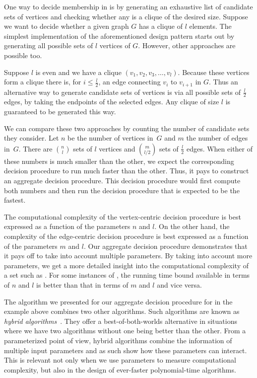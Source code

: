 \begin{example}
  One way to decide membership in  is by generating an exhaustive list of candidate sets of vertices and checking whether any is a clique of the desired size.
  Suppose we want to decide whether a given graph $G$ has a clique of $l$ elements.
  The simplest implementation of the aforementioned design pattern starts out by generating all possible sets of $l$ vertices of $G$.
  However, other approaches are possible too.

  Suppose $l$ is even and we have a clique $(v_1, v_2, v_3, \ldots, v_l)$.
  Because these vertices form a clique there is, for $i \le \frac{l}{2}$, an edge connecting $v_i$ to $v_{i + 1}$ in $G$.
  Thus an alternative way to generate candidate sets of vertices is via all possible sets of $\frac{l}{2}$ edges, by taking the endpoints of the selected edges.
  Any clique of size $l$ is guaranteed to be generated this way.

  We can compare these two approaches by counting the number of candidate sets they consider.
  Let $n$ be the number of vertices in~$G$ and $m$ the number of edges in~$G$.
  There are $\binom{n}{l}$ sets of $l$ vertices and $\binom{m}{l / 2}$ sets of $\frac{l}{2}$ edges.
  When either of these numbers is much smaller than the other, we expect the corresponding decision procedure to run much faster than the other.
  Thus, it pays to construct an aggregate decision procedure.
  This decision procedure would first compute both numbers and then run the decision procedure that is expected to be the fastest.

  The computational complexity of the vertex-centric decision procedure is best expressed as a function of the parameters $n$ and $l$.
  On the other hand, the complexity of the edge-centric decision procedure is best expressed as a function of the parameters $m$ and $l$.
  Our aggregate decision procedure demonstrates that it pays off to take into account multiple parameters.
  By taking into account more parameters, we get a more detailed insight into the computational complexity of a set such as .
  For some instances of , the running time bound available in terms of $n$ and $l$ is better than that in terms of $m$ and $l$ and vice versa.
\end{example}

The algorithm we presented for our aggregate decision procedure for  in the example above combines two other algorithms.
Such algorithms are known as \emph{hybrid algorithms}~\parencite{malek1994hybrid}.
They offer a best-of-both-worlds alternative in situations where we have two algorithms without one being better than the other.
From a parameterized point of view, hybrid algorithms combine the information of multiple input parameters and as such show how these parameters can interact.
This is relevant not only when we use parameters to measure computational complexity, but also in the design of ever-faster polynomial-time algorithms.

